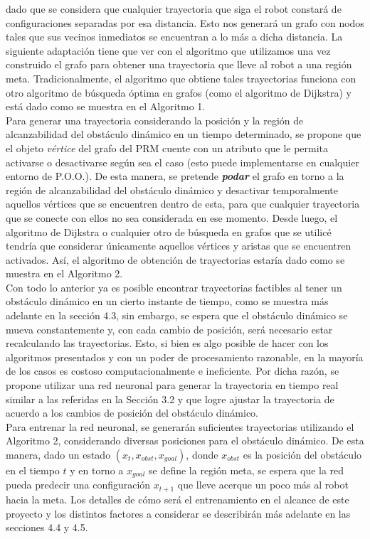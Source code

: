 \documentclass[spanish,mexico]{article}
\numberwithin{equation}{section}
\theoremstyle{definition}
\theoremstyle{remark}
\begin{document}
dado que se considera que cualquier trayectoria que siga el robot constará de configuraciones separadas por esa distancia. Esto nos generará un grafo con nodos tales que sus vecinos inmediatos se encuentran a lo más a dicha distancia. La siguiente adaptación tiene que ver con el algoritmo que utilizamos una vez construido el grafo para obtener una trayectoria que lleve al robot a una región meta. Tradicionalmente, el algoritmo que obtiene tales trayectorias funciona con otro algoritmo de búsqueda óptima en grafos (como el algoritmo de Dijkstra) y está dado como se muestra en el Algoritmo 1.\\

Para generar una trayectoria considerando la posición y la región de alcanzabilidad del obstáculo dinámico en un tiempo determinado, se propone que el objeto \textit{vértice} del grafo del PRM cuente con un atributo que le permita activarse o desactivarse según sea el caso (esto puede implementarse en cualquier entorno de P.O.O.). De esta manera, se pretende \textit{\textbf{podar}} el grafo en torno a la región de alcanzabilidad del obstáculo dinámico y desactivar temporalmente aquellos vértices que se encuentren dentro de esta, para que cualquier trayectoria que se conecte con ellos no sea considerada en ese momento. Desde luego, el algoritmo de Dijkstra o cualquier otro de búsqueda en grafos que se utilicé tendría que considerar únicamente aquellos vértices y aristas que se encuentren activados. Así, el algoritmo de obtención de trayectorias estaría dado como se muestra en el Algoritmo 2.\\

Con todo lo anterior ya es posible encontrar trayectorias factibles al tener un obstáculo dinámico en un cierto instante de tiempo, como se muestra más adelante en la sección 4.3, sin embargo, se espera que el obstáculo dinámico se mueva constantemente y, con cada cambio de posición, será necesario estar recalculando las trayectorias. Esto, si bien es algo posible de hacer con los algoritmos presentados y con un poder de procesamiento razonable, en la mayoría de los casos es costoso computacionalmente e ineficiente. Por dicha razón, se propone utilizar una red neuronal para generar la trayectoria en tiempo real similar a las referidas en la Sección 3.2 y que logre ajustar la trayectoria de acuerdo a los cambios de posición del obstáculo dinámico.\\

Para entrenar la red neuronal, se generarán suficientes trayectorias utilizando el Algoritmo 2, considerando diversas posiciones para el obstáculo dinámico. De esta manera, dado un estado $(x_t, x_{obst}, x_{goal})$, donde $x_{obst}$ es la posición del obstáculo en el tiempo $t$ y en torno a $x_{goal}$ se define la región meta, se espera que la red pueda predecir una configuración $x_{t+1}$ que lleve acerque un poco más al robot hacia la meta. Los detalles de cómo será el entrenamiento en el alcance de este proyecto y los distintos factores a considerar se describirán más adelante en las secciones 4.4 y 4.5.
\newpage
\end{document}

